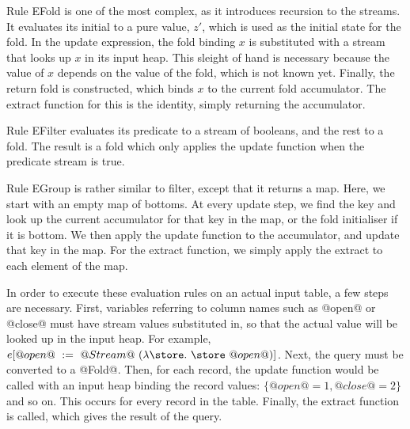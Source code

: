 Rule EFold is one of the most complex, as it introduces recursion to the streams.
It evaluates its initial to a pure value, $z'$, which is used as the initial state for the fold.
In the update expression, the fold binding $x$ is substituted with a stream that looks up $x$ in its input heap.
This sleight of hand is necessary because the value of $x$ depends on the value of the fold, which is not known yet.
Finally, the return fold is constructed, which binds $x$ to the current fold accumulator.
The extract function for this is the identity, simply returning the accumulator.

Rule EFilter evaluates its predicate to a stream of booleans, and the rest to a fold.
The result is a fold which only applies the update function when the predicate stream is true.

Rule EGroup is rather similar to filter, except that it returns a map.
Here, we start with an empty map of bottoms.
At every update step, we find the key and look up the current accumulator for that key in the map, or the fold initialiser if it is bottom.
We then apply the update function to the accumulator, and update that key in the map.
For the extract function, we simply apply the extract to each element of the map.

In order to execute these evaluation rules on an actual input table, a few steps are necessary.
First, variables referring to column names such as @open@ or @close@ must have stream values substituted in, so that the actual value will be looked up in the input heap.
For example, $e[@open@~:=~@Stream@~(\lam{\store} \store~@open@)]$.
Next, the query must be converted to a @Fold@.
Then, for each record, the update function would be called with an input heap binding the record values: $\{@open@ = 1, @close@ = 2\}$ and so on.
This occurs for every record in the table.
Finally, the extract function is called, which gives the result of the query.

